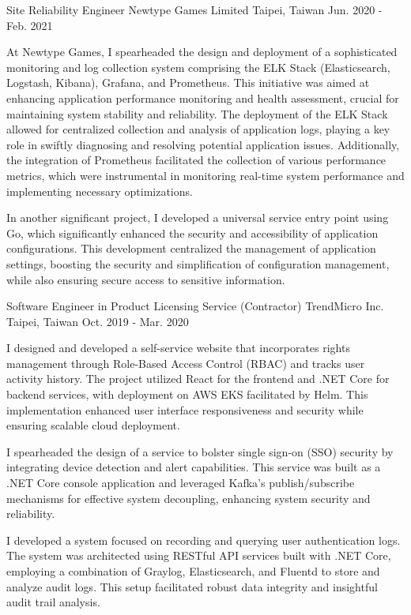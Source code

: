 \begin{cventries}
\cventry
{Site Reliability Engineer} %
{Newtype Games Limited} %
{Taipei, Taiwan} %
{Jun. 2020 - Feb. 2021} %
{
  \begin{cvitems} %
    \item {At Newtype Games, I spearheaded the design and deployment of a sophisticated monitoring and log collection system comprising the ELK Stack (Elasticsearch, Logstash, Kibana), Grafana, and Prometheus. This initiative was aimed at enhancing application performance monitoring and health assessment, crucial for maintaining system stability and reliability. The deployment of the ELK Stack allowed for centralized collection and analysis of application logs, playing a key role in swiftly diagnosing and resolving potential application issues. Additionally, the integration of Prometheus facilitated the collection of various performance metrics, which were instrumental in monitoring real-time system performance and implementing necessary optimizations.}
    \item {In another significant project, I developed a universal service entry point using Go, which significantly enhanced the security and accessibility of application configurations. This development centralized the management of application settings, boosting the security and simplification of configuration management, while also ensuring secure access to sensitive information.}
  \end{cvitems}
}

\cventry
{Software Engineer in Product Licensing Service (Contractor)} %
{TrendMicro Inc.} %
{Taipei, Taiwan} %
{Oct. 2019 - Mar. 2020} %
{
  \begin{cvitems} %
    \item {I designed and developed a self-service website that incorporates rights management through Role-Based Access Control (RBAC) and tracks user activity history. The project utilized React for the frontend and .NET Core for backend services, with deployment on AWS EKS facilitated by Helm. This implementation enhanced user interface responsiveness and security while ensuring scalable cloud deployment.}
    \item {I spearheaded the design of a service to bolster single sign-on (SSO) security by integrating device detection and alert capabilities. This service was built as a .NET Core console application and leveraged Kafka’s publish/subscribe mechanisms for effective system decoupling, enhancing system security and reliability.}
    \item {I developed a system focused on recording and querying user authentication logs. The system was architected using RESTful API services built with .NET Core, employing a combination of Graylog, Elasticsearch, and Fluentd to store and analyze audit logs. This setup facilitated robust data integrity and insightful audit trail analysis.}
  \end{cvitems}
}


\end{cventries}
